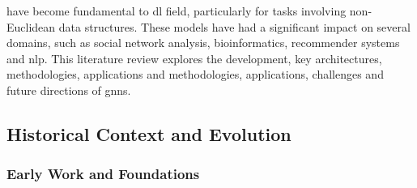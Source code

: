  have become fundamental to \acrlong{dl} field, particularly for tasks involving non-Euclidean data structures.
These models have had a significant impact on several domains, such as social network analysis, bioinformatics, recommender systems and \gls{nlp}.
This literature review explores the development, key architectures, methodologies, applications and methodologies, applications, challenges and future directions of \glspl{gnn}.

\subsection*{Historical Context and Evolution}

\subsubsection*{Early Work and Foundations}

